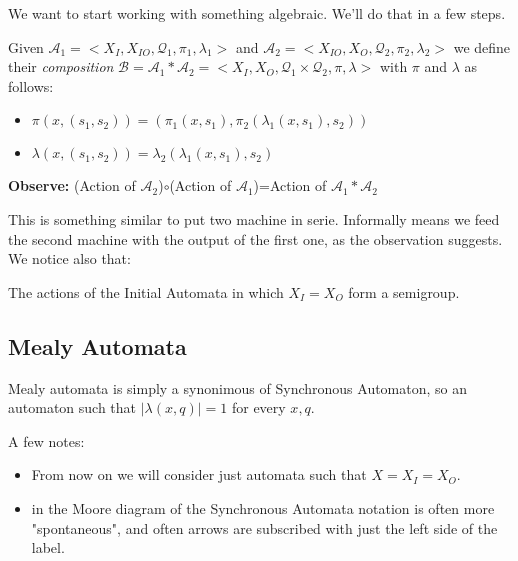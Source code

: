 \documentclass[mat1]{fmfdeloTS}
\newcommand{\auto}{\mathcal{A}}
\newcommand{\QQ}{\mathcal{Q}}
\begin{document}

We want to start working with something algebraic. We'll do that in a few steps.
\begin{definition}
Given $\auto_1=<X_I,X_{IO},\QQ_1,\pi_1,\lambda_1>$ and $\auto_2=<X_{IO},X_O,\QQ_2,\pi_2,\lambda_2> $ we define their \emph{composition} $\mathcal{B}=\auto_1*\auto_2=<X_I,X_O,\QQ_1\times\QQ_2,\pi,\lambda>$ with $\pi$ and $\lambda$ as follows:
\begin{itemize}
\item $\pi(x,(s_1,s_2))=(\pi_1(x,s_1),\pi_2(\lambda_1(x,s_1),s_2))$
\item $\lambda(x,(s_1,s_2))=\lambda_2(\lambda_1(x,s_1),s_2)$
\end{itemize}
\textbf{Observe:}
(Action of $\auto_2$)$\circ$(Action of $\auto_1$)=Action of $\auto_1*\auto_2$
\end{definition}
This is something similar to put two machine in serie. Informally means we feed the second machine with the output of the first one, as the observation suggests. We notice also that:

\begin{proposition}
The actions of the Initial Automata in which $X_I=X_O$ form a semigroup.
\end{proposition}
\bigskip
\bigskip
\bigskip
\subsection{Mealy Automata}

Mealy automata is simply a synonimous of Synchronous Automaton, so an automaton such that $|\lambda(x,q)|=1$ for every $x,q$. 

A few notes:
\begin{itemize}
\item From now on we will consider just automata such that $X=X_I=X_O$.
\item in the Moore diagram of the Synchronous Automata notation is often more "spontaneous", and often arrows are subscribed with just the left side of the label.
\end{itemize}
\end{document}
